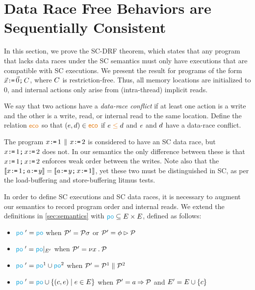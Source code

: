 \section{Data Race Free Behaviors are Sequentially Consistent}
\label{sec:sc}




In this section, we prove the SC-DRF theorem, which states that any program
that lacks data races under the SC semantics must only have executions that
are compatible with SC executions.  We present the result for programs of the
form $\vec{x}\texttt{:}\mkern-1mu\texttt{=}\,\vec{0}\texttt{;}\,C$, where $C$ is restriction-free.  Thus, all memory locations are initialized to $0$, and internal actions only arise from (intra-thread) implicit reads.

We say that two actions have a \emph{data-race conflict} if at least one
action is a write and the other is a write, read, or internal read to the
same location.  Define the relation $\reco$ so that $(\aEv,\bEv)\in{\reco}$
if $\aEv\gtN\bEv$ and $e$ and $d$ have a data-race conflict.

The program $x\texttt{:}\mkern-1mu\texttt{=}\,1\,\mathbin{\|}\, x\texttt{:}\mkern-1mu\texttt{=}\,2$ is considered to have an SC data race, but
$x\texttt{:}\mkern-1mu\texttt{=}\,1\texttt{;}\, x\texttt{:}\mkern-1mu\texttt{=}\,2$ does not.  In our semantics the only difference
between these is that $x\texttt{:}\mkern-1mu\texttt{=}\,1\texttt{;}\, x\texttt{:}\mkern-1mu\texttt{=}\,2$ enforces weak order between the
writes.  Note also that the
$\llbracket x\texttt{:}\mkern-1mu\texttt{=}\,1\texttt{;}\, a\texttt{:}\mkern-1mu\texttt{=}\, y\rrbracket=\llbracket a\texttt{:}\mkern-1mu\texttt{=}\, y\texttt{;}\, x\texttt{:}\mkern-1mu\texttt{=}\,1\rrbracket$, yet these two must
be distinguished in SC, as per the load-buffering and store-buffering litmus tests.

In order to define SC executions and SC data races, it is necessary to
augment our semantics to record program order and internal reads.  We extend the definitions in
\textsection\ref{sec:semantics} with
${\rpox}\subseteq{\Event}\times{\Event}$, defined as follows:
\begin{itemize}
\item
  ${\rpox'} = {\rpox}$
  when $\mathcal{P}'=\mathcal{P}\sigma$
  or $\mathcal{P}'=\phi\mathbin\rhd\mathcal{P}$
\item
  ${\rpox'} = {\rpox}\restrict{\Event'}$
  when $\mathcal{P}'=\nu x\mathbin.\mathcal{P}$
\item
  ${\rpox'} = {\rpox}^1\cup{\rpox}^2$
  when $\mathcal{P}'=\mathcal{P}^1\parallel\mathcal{P}^2$
\item
  ${\rpox'} = {\rpox}\cup\{(\cEv,\aEv)\mid\aEv\in\Event\}$
  when $\mathcal{P}'=a\mathbin\Rightarrow\mathcal{P}$ and $E' = E \cup \{c\}$
\end{itemize}

